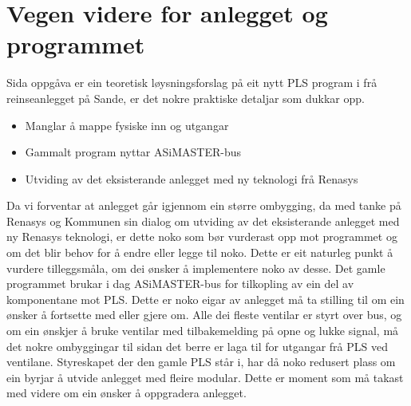 \section{Vegen videre for anlegget og programmet}
\thispagestyle{fancy}

Sida oppgåva er ein teoretisk løysningsforslag på eit nytt PLS program i frå reinseanlegget på Sande, er det nokre praktiske detaljar som dukkar opp.

\begin{itemize}
    \item Manglar å mappe fysiske inn og utgangar
    \item Gammalt program nyttar ASiMASTER-bus  
    \item Utviding av det eksisterande anlegget med ny teknologi frå Renasys
\end{itemize}

Da vi forventar at anlegget går igjennom ein større ombygging,  da med tanke på Renasys og Kommunen sin dialog om utviding av det eksisterande anlegget med ny Renasys teknologi, er dette noko som bør vurderast opp mot programmet og om det blir behov for å endre eller legge til noko. 
Dette er eit naturleg punkt å vurdere tilleggsmåla, om dei ønsker å implementere noko av desse.
Det gamle programmet brukar i dag ASiMASTER-bus for tilkopling av ein del av komponentane mot PLS. 
Dette er noko eigar av anlegget må ta stilling til om ein ønsker å fortsette med eller gjere om. Alle dei fleste ventilar er styrt over bus, og om ein ønskjer å bruke ventilar med tilbakemelding på opne og lukke signal, må det nokre ombyggingar til sidan det berre er laga til for utgangar frå PLS ved ventilane.
Styreskapet der den gamle PLS står i, har då noko redusert plass om ein byrjar å utvide anlegget med fleire modular. 
Dette er moment som må takast med videre om ein ønsker å oppgradera anlegget. 


